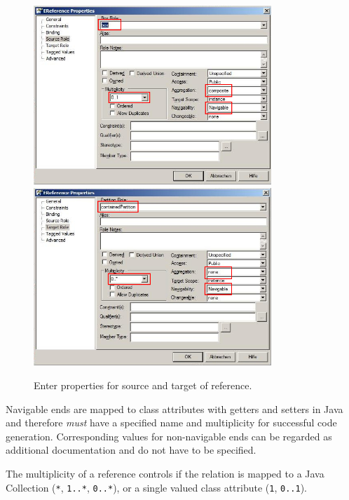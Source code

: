 \begin{enumerate}
\begin{figure}[htbp]
	\centering 
  \includegraphics[width=0.8\textwidth]{pics/memBoxBilder/memBox26.png}\\
  \vspace{0.5cm}
  \includegraphics[width=0.8\textwidth]{pics/memBoxBilder/memBox27.png}
	\caption{Enter properties for source and target of reference.}
	\label{fig:reference_ends}
\end{figure}
\end{enumerate}

Navigable ends are mapped to class attributes with getters and setters in Java and therefore \emph{must} have a specified name and  multiplicity for successful code generation.  
Corresponding values for non-navigable ends can  be regarded as additional documentation and do not have to be specified.
 
The multiplicity of a reference controls if the relation is mapped to a Java Collection (\texttt{*},  \texttt{1..*}, \texttt{0..*}), or a single valued class attribute (\texttt{1}, \texttt{0..1}).

